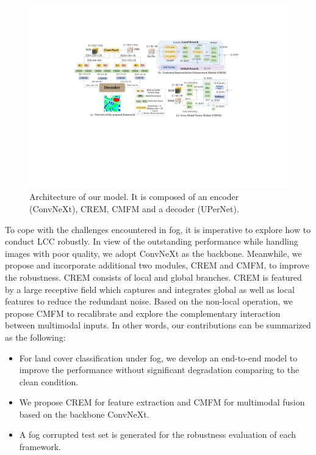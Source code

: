 \documentclass[lettersize,journal]{IEEEtran}
\begin{document}
\begin{figure}[!htbp]
    \centering
    \includegraphics[width=\textwidth]{overall.pdf}
    \caption{Architecture of our model. It is composed of an encoder (ConvNeXt), CREM, CMFM and a decoder (UPerNet).}
    \label{backbone}
    \vspace{-0.2cm}
\end{figure}

To cope with the challenges encountered in fog, it is imperative to explore how to conduct LCC robustly. In view of the outstanding performance while handling images with poor quality, we adopt ConvNeXt \cite{liuConvNet2020s2022} as the backbone. Meanwhile, we propose and incorporate additional two modules, CREM and CMFM, to improve the robustness. CREM consists of local and global branches. CREM is featured by a large receptive field which captures and integrates global as well as local features to reduce the redundant noise. Based on the non-local operation, we propose CMFM to recalibrate and explore  the complementary interaction between multimodal inputs. In other words, our contributions can be summarized as the following:

\begin{itemize}
    \item  For land cover classification under fog, we develop an end-to-end model to improve the performance without significant degradation comparing to the clean condition.
    \item We propose CREM for feature extraction and CMFM for multimodal fusion based on the backbone ConvNeXt.
    \item A fog corrupted test set is generated for the robustness evaluation of each framework. 
\end{itemize}
\end{document}
